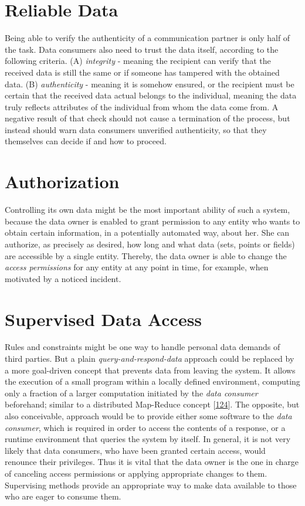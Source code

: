 \documentclass[12pt,english,a4paper,titlepage,cleardoublepage=empty,dottedtoc]{report}
\begin{document}
\section{Reliable Data}\label{reliable-data}

Being able to verify the authenticity of a communication partner is only
half of the task. Data consumers also need to trust the data itself,
according to the following criteria. (A) \emph{integrity} - meaning the
recipient can verify that the received data is still the same or if
someone has tampered with the obtained data. (B) \emph{authenticity} -
meaning it is somehow ensured, or the recipient must be certain that the
received data actual belongs to the individual, meaning the data truly
reflects attributes of the individual from whom the data come from. A
negative result of that check should not cause a termination of the
process, but instead should warn data consumers unverified authenticity,
so that they themselves can decide if and how to proceed.

\section{Authorization}\label{authorization}

Controlling its own data might be the most important ability of such a
system, because the data owner is enabled to grant permission to any
entity who wants to obtain certain information, in a potentially
automated way, about her. She can authorize, as precisely as desired,
how long and what data (sets, points or fields) are accessible by a
single entity. Thereby, the data owner is able to change the
\emph{access permissions} for any entity at any point in time, for
example, when motivated by a noticed incident.

\hypertarget{supervised-data-access}{\section{Supervised Data
Access}\label{supervised-data-access}}

Rules and constraints might be one way to handle personal data demands
of third parties. But a plain \emph{query-and-respond-data} approach
could be replaced by a more goal-driven concept that prevents data from
leaving the system. It allows the execution of a small program within a
locally defined environment, computing only a fraction of a larger
computation initiated by the \emph{data consumer} beforehand; similar to
a distributed Map-Reduce concept
{[}\protect\hyperlink{ref-paper_2004_distributed-mapreduce}{124}{]}. The
opposite, but also conceivable, approach would be to provide either some
software to the \emph{data consumer}, which is required in order to
access the contents of a response, or a runtime environment that queries
the system by itself. In general, it is not very likely that data
consumers, who have been granted certain access, would renounce their
privileges. Thus it is vital that the data owner is the one in charge of
canceling access permissions or applying appropriate changes to them.
Supervising methods provide an appropriate way to make data available to
those who are eager to consume them.
\end{document}
